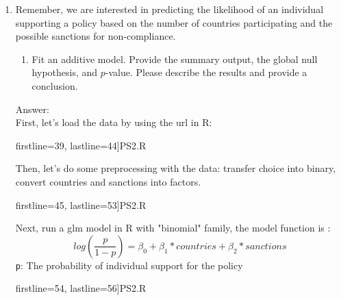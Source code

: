 \documentclass[12pt,letterpaper]{article}
\begin{document}
\begin{enumerate}
	\item
	Remember, we are interested in predicting the likelihood of an individual supporting a policy based on the number of countries participating and the possible sanctions for non-compliance.
	\begin{enumerate}
		\item [] Fit an additive model. Provide the summary output, the global null hypothesis, and $p$-value. Please describe the results and provide a conclusion.
	\end{enumerate}

\noindent Answer:\\
\noindent First, let's load the data by using the url in R:

		 firstline=39, lastline=44]{PS2.R}
		
\noindent Then, let's do some preprocessing with the data: transfer choice into binary, convert countries and sanctions into factors.

		 firstline=45, lastline=53]{PS2.R}

\noindent Next, run a glm model in R with "binomial" family, the model function is :
\[
log(\frac{p}{1-p}) = \beta_0 + \beta_1*countries + \beta_2*sanctions 
\]
\noindent \texttt{p}: The probability of individual support for the policy

		 firstline=54, lastline=56]{PS2.R}


\end{enumerate}
\end{document}
